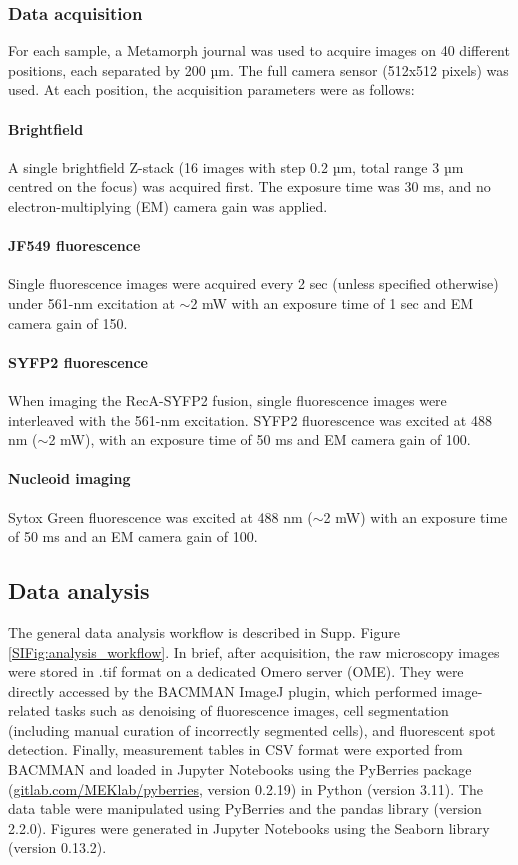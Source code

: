 \subsubsection*{Data acquisition}
For each sample, a Metamorph journal was used to acquire images on 40 different positions, each separated by 200 µm. The full camera sensor (512x512 pixels) was used. At each position, the acquisition parameters were as follows:

\paragraph*{Brightfield} A single brightfield Z-stack (16 images with step 0.2 µm, total range 3 µm centred on the focus) was acquired first. The exposure time was 30 ms, and no electron-multiplying (EM) camera gain was applied.

\paragraph*{JF549 fluorescence} Single fluorescence images were acquired every 2 sec (unless specified otherwise) under 561-nm excitation at $\sim$2 mW with an exposure time of 1 sec and EM camera gain of 150.

\paragraph*{SYFP2 fluorescence} When imaging the RecA-SYFP2 fusion, single fluorescence images were interleaved with the 561-nm excitation. SYFP2 fluorescence was excited at 488 nm ($\sim$2 mW), with an exposure time of 50 ms and EM camera gain of 100.

\paragraph*{Nucleoid imaging} Sytox Green fluorescence was excited at 488 nm ($\sim$2 mW) with an exposure time of 50 ms and an EM camera gain of 100.


\subsection*{Data analysis}
The general data analysis workflow is described in Supp. Figure \ref{SIFig:analysis_workflow}. In brief, after acquisition, the raw microscopy images were stored in .tif format on a dedicated Omero server (OME). They were directly accessed by the BACMMAN ImageJ plugin\cite{}, which performed image-related tasks such as denoising of fluorescence images, cell segmentation (including manual curation of incorrectly segmented cells), and fluorescent spot detection. Finally, measurement tables in CSV format were exported from BACMMAN and loaded in Jupyter Notebooks using the PyBerries package (\href{gitlab.com/MEKlab/pyberries}{gitlab.com/MEKlab/pyberries}, version 0.2.19) in Python (version 3.11). The data table were manipulated using PyBerries and the pandas library (version 2.2.0). Figures were generated in Jupyter Notebooks using the Seaborn library (version 0.13.2).

